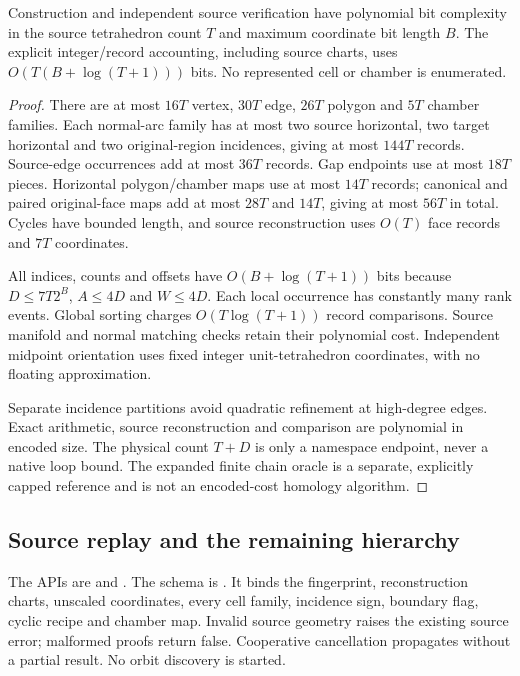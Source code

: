 \begin{proposition}
Construction and independent source verification have polynomial bit
complexity in the source tetrahedron count $T$ and maximum coordinate bit
length $B$. The explicit integer/record accounting, including source charts,
uses $O(T(B+\log(T+1)))$ bits. No represented cell or chamber is enumerated.
\end{proposition}
\begin{proof}
There are at most $16T$ vertex, $30T$ edge, $26T$ polygon and $5T$ chamber
families. Each normal-arc family has at most two source horizontal, two
target horizontal and two original-region incidences, giving at most
$144T$ records. Source-edge occurrences add at most $36T$ records.
Gap endpoints use at most $18T$ pieces. Horizontal polygon/chamber maps
use at most $14T$ records; canonical and paired original-face maps add
at most $28T$ and $14T$, giving at most $56T$ in total. Cycles have bounded
length, and source reconstruction uses $O(T)$ face records and $7T$ coordinates.

All indices, counts and offsets have $O(B+\log(T+1))$ bits because
$D\le7T2^B$, $A\le4D$ and $W\le4D$. Each local occurrence has constantly
many rank events. Global sorting charges $O(T\log(T+1))$ record comparisons.
Source manifold and normal matching checks retain their polynomial cost.
Independent midpoint orientation uses fixed integer unit-tetrahedron
coordinates, with no floating approximation.

Separate incidence partitions avoid quadratic refinement at high-degree
edges. Exact arithmetic, source reconstruction and comparison are polynomial
in encoded size. The physical count $T+D$ is only a namespace endpoint,
never a native loop bound. The expanded finite chain oracle is a separate,
explicitly capped reference and is not an encoded-cost homology algorithm.
\end{proof}

\subsection{Source replay and the remaining hierarchy}

The APIs are  and
. The schema is
. It binds the fingerprint, reconstruction charts,
unscaled coordinates, every cell family, incidence sign, boundary flag,
cyclic recipe and chamber map. Invalid source geometry raises the existing
source error; malformed proofs return false. Cooperative cancellation
propagates without a partial result. No orbit discovery is started.

